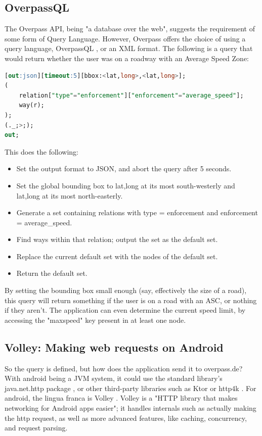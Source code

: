 \documentclass[11pt, a4paper, notitlepage]{report}
\begin{document}
\subsection{OverpassQL}
The Overpass API, being "a database over the web", suggests the requirement of some form of Query Language. However, Overpass offers the choice of using a query language, OverpassQL \citep{overpassQLWiki}, or an XML format. The following is a query that would return whether the user was on a roadway with an Average Speed Zone:
\begin{lstlisting}[language=SQL]
[out:json][timeout:5][bbox:<lat,long>,<lat,long>];
(
    relation["type"="enforcement"]["enforcement"="average_speed"];
    way(r);
);
(._;>;);
out;
\end{lstlisting}
This does the following:
\begin{itemize}
	\item Set the output format to JSON, and abort the query after 5 seconds.
	\item Set the global bounding box to lat,long at its most south-westerly and lat,long at its most north-easterly.
	\item Generate a set containing relations with type = enforcement and enforcement = average\_speed.
	\item Find ways within that relation; output the set as the default set.
	\item Replace the current default set with the nodes of the default set.
	\item Return the default set.
\end{itemize}
By setting the bounding box small enough (say, effectively the size of a road), this query will return something if the user is on a road with an ASC, or nothing if they aren't. The application can even determine the current speed limit, by accessing the "maxspeed" key present in at least one node.

\subsection{Volley: Making web requests on Android}
So the query is defined, but how does the application send it to overpass.de? With android being a JVM system, it could use the standard library's java.net.http package \citep{javanethttp}, or other third-party libraries such as Ktor \citep{ktor} or http4k \citep{http4k}. For android, the lingua franca is Volley \citep{volley}. Volley is a "HTTP library that makes networking for Android apps easier"; it handles internals such as actually making the http request, as well as more advanced features, like caching, concurrency, and request parsing.
\end{document}
